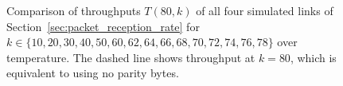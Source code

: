 \begin{figure}[t]
{		\label{fig:throughput_link_10_receiver_fec}
	}
	\caption{Comparison of throughputs $T(80, k)$ of all four simulated links of Section~\ref{sec:packet_reception_rate} for \\$k \in \{10,20,30,40,50,60,62,64,66,68,70,72,74,76,78\}$ over temperature. The dashed line shows throughput at $k=80$, which is equivalent to using no parity bytes.}
	\label{fig:throughput_link_fec}
\end{figure}

